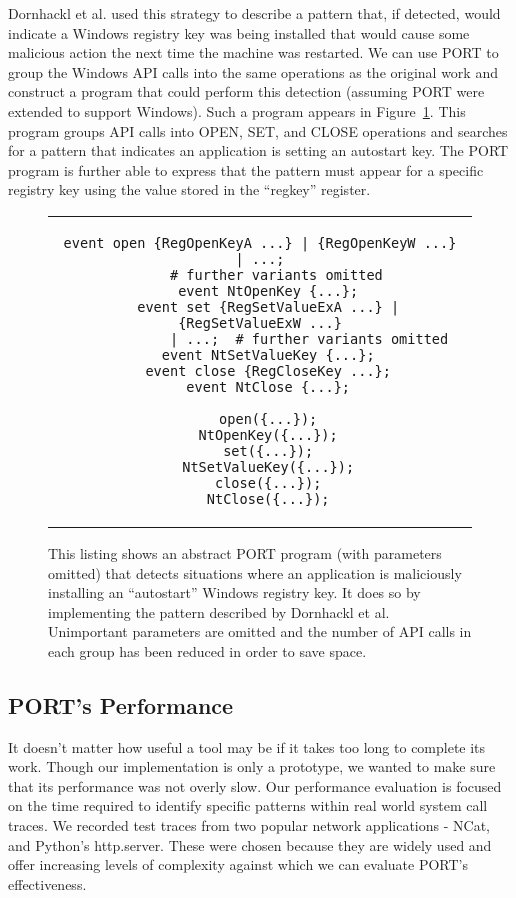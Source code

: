 Dornhackl et al. used this strategy to describe a pattern that, if
detected, would indicate
a Windows registry key was being installed
that would cause some malicious action
the next time the machine was restarted.  We can use PORT to group the
Windows API calls into the same operations as the original work and
construct a program that could perform this detection (assuming PORT were
extended to support Windows).  Such a program appears in
Figure~\ref{lst:PORTRegDetect}.  This program groups API calls into OPEN,
SET, and CLOSE operations and searches for a pattern that
indicates
an application is
setting an autostart key.  The PORT program is further able to express
that the pattern must appear for a specific registry key using the value
stored in the ``regkey'' register.

\begin{figure}[H]
\centering
\begin{tabular}{c}
\begin{lstlisting}[gobble=2]
  event open {RegOpenKeyA ...} | {RegOpenKeyW ...} | ...;
    # further variants omitted
  event NtOpenKey {...};
  event set {RegSetValueExA ...} | {RegSetValueExW ...}
            | ...;  # further variants omitted
  event NtSetValueKey {...};
  event close {RegCloseKey ...};
  event NtClose {...};

  open({...});
  NtOpenKey({...});
  set({...});
  NtSetValueKey({...});
  close({...});
  NtClose({...});
\end{lstlisting}
\end{tabular}
  \caption{This listing shows an abstract PORT program (with parameters
  omitted) that detects situations where an application is maliciously
  installing an ``autostart'' Windows registry key.  It does so by
  implementing the pattern described by Dornhackl et al.  Unimportant
  parameters are omitted and the number of API calls in each group has been
  reduced in order to save space.}
\label{lst:PORTRegDetect}
\end{figure}


\subsection{PORT's Performance}

It doesn't matter how useful a tool may be
if it takes too long to complete its work.
Though our implementation is
only a prototype, we wanted to make sure that its performance was not
overly slow.
Our performance evaluation
is focused on the time required
to identify specific
patterns within real world system call traces.
We recorded test traces
from two popular network applications -
NCat,
and
Python's http.server.
These
were chosen because they are widely used and
offer increasing levels of complexity against which we can evaluate
PORT's effectiveness.

